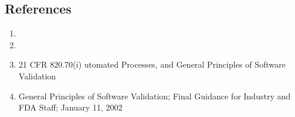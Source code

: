 \subsection{References}
\begin{enumerate}
  \item \sopSDLC
  \item \sopSCM
  \item 21 CFR 820.70(i) utomated Processes, and General Principles of Software
    Validation
  \item General Principles of Software Validation; Final Guidance for Industry
    and FDA Staff; January 11, 2002
\end{enumerate}

